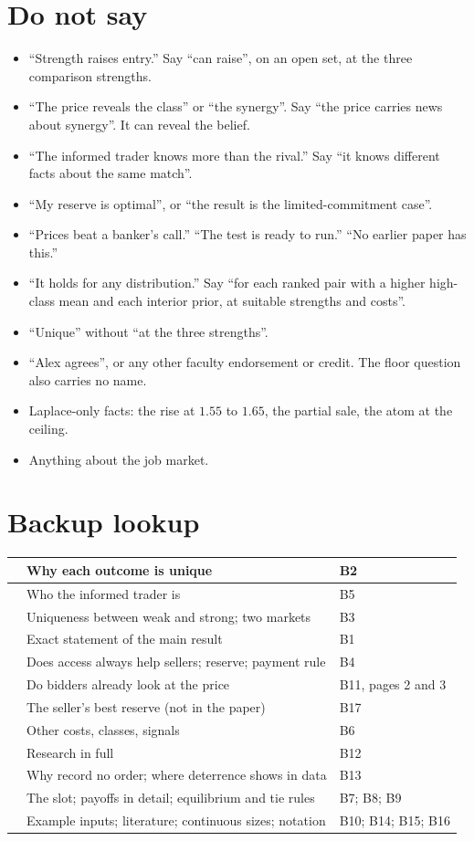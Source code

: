 \documentclass[10.5pt]{article}
\makeatletter
\newenvironment{cards}{\begin{longtable}{@{}IQA@{}}}{\end{longtable}}
\newcommand{\card}[3]{#1 & #2 & #3\\\midrule}
\makeatother
\begin{document}
\section{Do not say}
\begin{itemize}[nosep,leftmargin=1.5em]
\item ``Strength raises entry.'' Say ``can raise'', on an open set, at the three comparison strengths.
\item ``The price reveals the class'' or ``the synergy''. Say ``the price carries news about synergy''. It can reveal the belief.
\item ``The informed trader knows more than the rival.'' Say ``it knows different facts about the same match''.
\item ``My reserve is optimal'', or ``the result is the limited-commitment case''.
\item ``Prices beat a banker's call.'' ``The test is ready to run.'' ``No earlier paper has this.''
\item ``It holds for any distribution.'' Say ``for each ranked pair with a higher high-class mean and each interior prior, at suitable strengths and costs''.
\item ``Unique'' without ``at the three strengths''.
\item ``Alex agrees'', or any other faculty endorsement or credit. The floor question also carries no name.
\item Laplace-only facts: the rise at $1.55$ to $1.65$, the partial sale, the atom at the ceiling.
\item Anything about the job market.
\end{itemize}

\section{Backup lookup}
\begin{cards}
\card{}{Why each outcome is unique}{B2}
\card{}{Who the informed trader is}{B5}
\card{}{Uniqueness between weak and strong; two markets}{B3}
\card{}{Exact statement of the main result}{B1}
\card{}{Does access always help sellers; reserve; payment rule}{B4}
\card{}{Do bidders already look at the price}{B11, pages 2 and 3}
\card{}{The seller's best reserve (not in the paper)}{B17}
\card{}{Other costs, classes, signals}{B6}
\card{}{Research in full}{B12}
\card{}{Why record no order; where deterrence shows in data}{B13}
\card{}{The slot; payoffs in detail; equilibrium and tie rules}{B7; B8; B9}
\card{}{Example inputs; literature; continuous sizes; notation}{B10; B14; B15; B16}
\end{cards}
\end{document}
